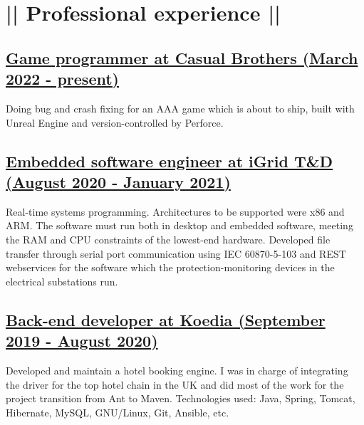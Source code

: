 \section*{|| Professional experience ||}
\subsection*{\underline{Game programmer at Casual Brothers  (March 2022 - present)}}
Doing bug and crash fixing for an AAA game which is about to ship, built with Unreal Engine and version-controlled by Perforce.


\subsection*{\underline{Embedded software engineer at iGrid T\&D (August 2020 - January 2021)}}
Real-time systems programming. Architectures to be supported were x86 and ARM. The software must run both in desktop and embedded software, meeting the RAM and CPU constraints of the lowest-end hardware. Developed file transfer through serial port communication using IEC 60870-5-103 and REST webservices for the software which the protection-monitoring devices in the electrical substations run.

\subsection*{\underline{Back-end developer at Koedia (September 2019 - August 2020)}}
Developed and maintain a hotel booking engine. I was in charge of integrating the driver	for the top hotel chain in the UK and did most of the work for the project transition from 	Ant to Maven. Technologies used: Java, Spring, Tomcat, Hibernate, MySQL, GNU/Linux, Git, Ansible, etc.
